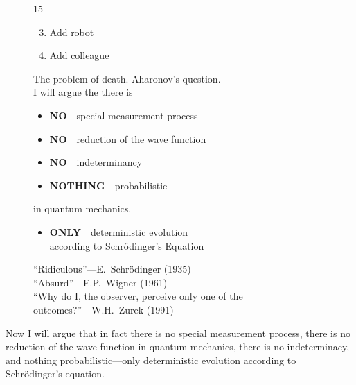 \documentclass[twocolumn,prb]{revtex4}
\begin{document}
\begin{figure}[htb] 
\begin{mdframed}
  \vspace{5pt}\hfill 15\\[-18pt]
  \begin{raggedright}
  \begin{enumerate}[label={(\arabic*)}]\setcounter{enumi}{2}
    \item Add robot
    \item Add colleague\\[5pt]
  \end{enumerate}

    The problem of death. %
    Aharonov's question.\\[\baselineskip]
    I will argue the there is
    \begin{itemize}[label={}]
    \item {\bf NO}\ \ special measurement process  
    \item {\bf NO}\ \ reduction of the wave function 
    \item {\bf NO}\ \ indeterminancy
    \item {\bf NOTHING}\ \ probabilistic
    \end{itemize}
    in quantum mechanics.
    \begin{itemize}[label={}]
    \item {\bf ONLY}\ \ deterministic evolution\\ %
      \hspace{33pt} according to Schrödinger's Equation\\[10pt]
    \end{itemize}

    ``Ridiculous''---E.~Schrödinger (1935) \\[0.5\baselineskip]

    ``Absurd''---E.P.~Wigner (1961) \\[0.5\baselineskip]

    ``Why do I, the observer, perceive only one of the\\ outcomes?''---W.H.~Zurek (1991)
  \end{raggedright}

\vspace{0.5\baselineskip}
\end{mdframed}
\end{figure}

Now I will argue that in fact there is no special measurement process, there is no reduction of the wave function in quantum mechanics, there is no indeterminacy, and nothing probabilistic---only deterministic evolution according to Schrödinger's equation.
\end{document}

